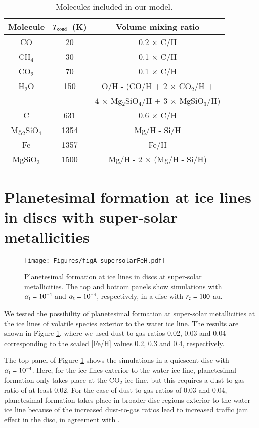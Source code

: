 \documentclass{aa}
\begin{document}
\begin{appendix}
\begin{table}[h!]
\centering
    \caption{Molecules included in our model.}
    \label{tab:molecules}
    \begin{tabular}{c c c}
    \hline\hline
    Molecule & $T_{\rm cond}$~(K) & Volume mixing ratio \\ 
    \hline
    CO              & 20   & 0.2 $\times$ C/H \\
    CH$_4$          & 30   & 0.1 $\times$ C/H \\
    CO$_2$          & 70   & 0.1 $\times$ C/H \\
    H$_2$O          & 150  & O/H - (CO/H + 2 $\times$ CO$_2$/H +  \\
                    &      & 4 $\times$ Mg$_2$SiO$_4$/H + 3 $\times$ MgSiO$_3$/H) \\ 
    C               & 631  & 0.6 $\times$ C/H  \\
    Mg$_2$SiO$_4$   & 1354 & Mg/H - Si/H \\
    Fe              & 1357 & Fe/H \\
    MgSiO$_3$       & 1500 & Mg/H - 2 $\times$ (Mg/H - Si/H)  \\
    \hline
    \end{tabular}
\end{table}

\section{Planetesimal formation at ice lines in discs with super-solar metallicities}
\label{AppendixSupersolar}
\begin{figure*}
   \texttt{[image: Figures/figA\_supersolarFeH.pdf]}
   \caption{Planetesimal formation at ice lines in discs at super-solar metallicities. The top and bottom panels show simulations with $\alpha_{\rm t}=10^{-4}$ and $\alpha_{\rm t}=10^{-3}$, respectively, in a disc with $r_{\rm c}=100$ au.}
   \label{fig:figA}
\end{figure*}
We tested the possibility of planetesimal formation at super-solar metallicities at the ice lines of volatile species exterior to the water ice line. The results are shown in Figure \ref{fig:figA}, where we used dust-to-gas ratios 0.02, 0.03 and 0.04 corresponding to the scaled [Fe/H] values 0.2, 0.3 and 0.4, respectively.

The top panel of Figure \ref{fig:figA} shows the simulations in a quiescent disc with $\alpha_{\rm t}=10^{-4}$. Here, for the ice lines exterior to the water ice line, planetesimal formation only takes place at the CO$_2$ ice line, but this requires a dust-to-gas ratio of at least 0.02. For the case of dust-to-gas ratios of 0.03 and 0.04, planetesimal formation takes place in broader disc regions exterior to the water ice line because of the increased dust-to-gas ratios lead to increased traffic jam effect in the disc, in agreement with \cite{DrazkowskaAlibert2017}.


\end{appendix}
\end{document}

